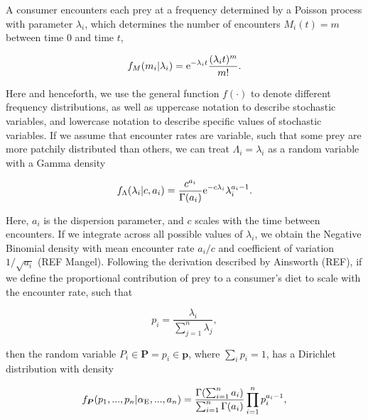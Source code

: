 \documentclass{frontiersSCNS}
\begin{document}
A consumer encounters each prey at a frequency determined by a Poisson process with parameter $\lambda_i$, which determines the number of encounters $M_i(t)=m$ between time 0 and time $t$,

\begin{equation}
f_M (m_i|\lambda_i) = {\rm e}^{-\lambda_i t}\frac{(\lambda_i t)^m}{m!}.
\end{equation}

\noindent Here and henceforth, we use the general function $f(\cdot)$ to denote different frequency distributions, as well as uppercase notation to describe stochastic variables, and lowercase notation to describe specific values of stochastic variables.
If we assume that encounter rates are variable, such that some prey are more patchily distributed than others, we can treat $\Lambda_i = \lambda_i$ as a random variable with a Gamma density

\begin{equation}
f_\Lambda (\lambda_i | c, a_i) = \frac{c^{a_i}}{\Gamma (a_i)}{\rm e}^{-c \lambda_i}\lambda_i^{a_i - 1}.
\end{equation}

\noindent Here, $a_i$ is the dispersion parameter, and $c$ scales with the time between encounters.
If we integrate across all possible values of $\lambda_i$, we obtain the Negative Binomial density with mean encounter rate $a_i/c$ and coefficient of variation $1/\sqrt{a_i}$ (REF Mangel).
Following the derivation described by Ainsworth (REF), if we define the proportional contribution of prey to a consumer's diet to scale with the encounter rate, such that

\begin{equation}
  p_i = \frac{\lambda_i}{\sum_{j=1}^n \lambda_j},
\end{equation}

\noindent then the random variable $P_i \in {\bm P} = p_i \in {\bm p}$, where $\sum_i p_i = 1$, has a Dirichlet distribution with density

\begin{equation}
  f_{\bm P}(p_1,...,p_n|\alpha_{\rm E},...,a_n) = \frac{\Gamma(\sum_{i=1}^n a_i)}{\sum_{i=1}^n\Gamma(a_i)}\prod_{i=1}^n p_i^{a_i - 1},
\end{equation}
\end{document}
